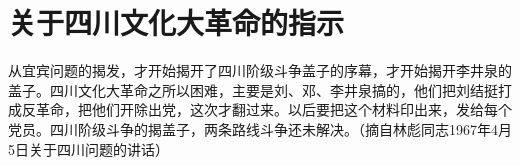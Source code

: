 \section[关于四川文化大革命的指示（一九六七年四月）]{关于四川文化大革命的指示}


从宜宾问题的揭发，才开始揭开了四川阶级斗争盖子的序幕，才开始揭开李井泉的盖子。四川文化大革命之所以困难，主要是刘、邓、李井泉搞的，他们把刘结挺打成反革命，把他们开除出党，这次才翻过来。以后要把这个材料印出来，发给每个党员。四川阶级斗争的揭盖子，两条路线斗争还未解决。（摘自林彪同志1967年4月5日关于四川问题的讲话）



